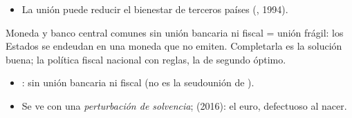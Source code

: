 \documentclass{article}
\begin{document}
\begin{columnas}
\begin{itemize}
\item La unión puede reducir el bienestar de terceros países (, 1994).
\end{itemize}

\begin{ideaclave}
Moneda y banco central comunes sin unión bancaria ni fiscal = unión frágil: los Estados se endeudan en una moneda que no emiten. Completarla es la solución buena; la política fiscal nacional con reglas, la de segundo óptimo.
\end{ideaclave}

\begin{itemize}
\item {}: sin unión bancaria ni fiscal (no es la seudounión de ).
\item Se ve con una \emph{perturbación de solvencia};  (2016): el euro, defectuoso al nacer.
\end{itemize}


\end{columnas}
\end{document}
